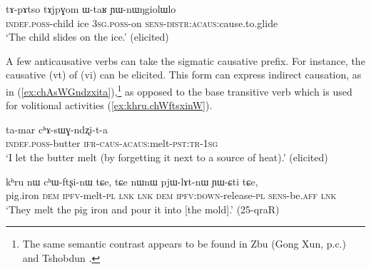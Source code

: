 \begin{exe}
\ex \label{ex:YWnWNgiolWlo}
\gll tɤ-pɤtso tɤjpɣom ɯ-taʁ ɲɯ-nɯŋgiolɯlo \\
\textsc{indef}.\textsc{poss}-child ice \textsc{3sg}.\textsc{poss}-on \textsc{sens}-\textsc{distr}:\textsc{acaus}:cause.to.glide \\
\glt `The child slides on the ice.' (elicited)
\end{exe}

A few anticausative verbs can take the sigmatic causative prefix. For instance, the causative  (vt) of  (vi) can be elicited. This form can express indirect causation, as in (\ref{ex:chAsWGndzxita}),\footnote{The same semantic contrast appears to be found in Zbu (Gong Xun, p.c.) and Tshobdun \citep{jackson14morpho}. } as opposed to the base transitive verb  which is used for volitional activities (\ref{ex:khru.chWftsxinW}).

\begin{exe}
\ex \label{ex:chAsWGndzxita}
\gll ta-mar cʰɤ-sɯɣ-ndʐi-t-a \\
\textsc{indef}.\textsc{poss}-butter \textsc{ifr}-\textsc{caus}-\textsc{acaus}:melt-\textsc{pst}:\textsc{tr}-\textsc{1sg} \\
\glt `I let the butter melt (by forgetting it next to a source of heat).' (elicited)
\end{exe}

\begin{exe}
\ex \label{ex:khru.chWftsxinW}
\gll kʰru nɯ cʰɯ-ftʂi-nɯ tɕe, tɕe nɯnɯ pjɯ-lɤt-nɯ ɲɯ-ɕti tɕe, \\
pig.iron \textsc{dem} \textsc{ipfv}-melt-\textsc{pl} \textsc{lnk} \textsc{lnk} \textsc{dem} \textsc{ipfv}:\textsc{down}-release-\textsc{pl} \textsc{sens}-be.\textsc{aff} \textsc{lnk} \\
\glt `They melt the pig iron and pour it into [the mold].' (25-qraR)
\end{exe}

